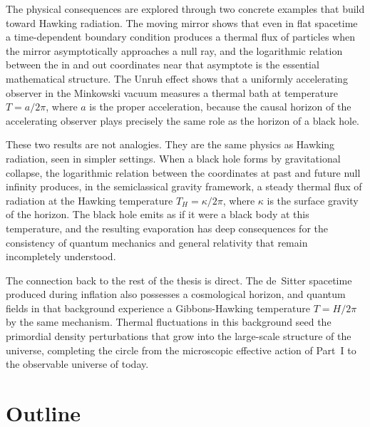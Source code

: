 The physical consequences are explored through two concrete examples
that build toward Hawking radiation. The moving mirror shows that
even in flat spacetime a time-dependent boundary condition produces
a thermal flux of particles when the mirror asymptotically approaches
a null ray, and the logarithmic relation between the in and out
coordinates near that asymptote is the essential mathematical
structure. The Unruh effect shows that a uniformly accelerating
observer in the Minkowski vacuum measures a thermal bath at
temperature $T = a/2\pi$, where $a$ is the proper acceleration,
because the causal horizon of the accelerating observer plays
precisely the same role as the horizon of a black hole.

These two results are not analogies. They are the same physics as
Hawking radiation, seen in simpler settings. When a black hole forms
by gravitational collapse, the logarithmic relation between the
coordinates at past and future null infinity produces, in the
semiclassical gravity framework, a steady thermal flux of radiation
at the Hawking temperature $T_H = \kappa/2\pi$, where $\kappa$ is
the surface gravity of the horizon. The black hole emits as if it
were a black body at this temperature, and the resulting evaporation
has deep consequences for the consistency of quantum mechanics and
general relativity that remain incompletely understood.

The connection back to the rest of the thesis is direct. The
de~Sitter spacetime produced during inflation also possesses a
cosmological horizon, and quantum fields in that background
experience a Gibbons-Hawking temperature $T = H/2\pi$ by the same
mechanism. Thermal fluctuations in this background seed the
primordial density perturbations that grow into the large-scale
structure of the universe, completing the circle from the microscopic
effective action of Part~I to the observable universe of today.\section*{Outline}

